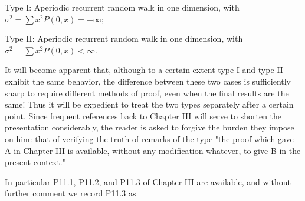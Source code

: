 Type I: Aperiodic recurrent random walk in one dimension, with $\sigma^2 = \sum x^2 P(0,x) = +\infty$;

Type II: Aperiodic recurrent random walk in one dimension, with $\sigma^2 = \sum x^2 P(0,x) < \infty$.

It will become apparent that, although to a certain extent type I and type II exhibit the same behavior, the difference between these two cases is sufficiently sharp to require different methods of proof, even when the final results are the same! Thus it will be expedient to treat the two types separately after a certain point. Since frequent references back to Chapter III will serve to shorten the presentation considerably, the reader is asked to forgive the burden they impose on him: that of verifying the truth of remarks of the type "the proof which gave A in Chapter III is available, without any modification whatever, to give B in the present context."

In particular P11.1, P11.2, and P11.3 of Chapter III are available, and without further comment we record P11.3 as